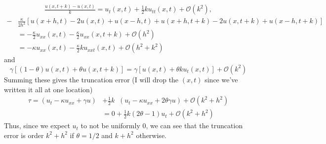 \documentclass[12pt]{article}
\def\O{\mathcal O}
\newcommand{\pdiff}[2][]{\mathop{\frac{\partial #1}{\partial #2}}}
\begin{document}
\begin{problems}
\begin{align*}
    \frac{u(x, t+k) - u(x, t)}{k} = 
    u_t(x,t) + \frac12 k u_{tt}(x,t) + \O(k^2),
\end{align*}
\begin{align*}
    -&\frac{\kappa}{2h^2}
    [u(x + h, t) - 2 u(x,t) + u(x-h, t) + u(x + h, t+k) - 2 u(x,t+k) + u(x-h, t+k)]\\
     &=-\frac\kappa2 u_{xx}(x,t) - \frac\kappa2 u_{xx}(x,t+k)+ \O(h^2)\\
     &=-\kappa u_{xx}(x,t) - \frac\kappa2 k u_{xxt}(x,t)+ \O(h^2 + k^2) 
\end{align*}
and 
$$\gamma[(1-\theta)u(x,t) + \theta u(x,t+k)] = 
\gamma[u(x,t) + \theta k u_t(x,t)] + \O(k^2)$$
Summing these gives the truncation error (I will drop the $(x,t)$ since we've written it 
all at one location)
\begin{align*}
\tau =    \left(u_t - \kappa u_{xx} + \gamma u\right)& 
+ \frac12 k \pdiff t\left(u_t - \kappa u_{xx} + 2\theta \gamma u\right) + \O(k^2 + h^2)\\
                                               & = 0 + \frac12 k (2\theta - 1) u_t + \O(k^2 + h^2)
\end{align*}
Thus, since we expect $u_t$ to not be uniformly 0, we can see that the truncation error 
is order $k^2 + h^2$ if $\theta = 1/2$ and $k + h^2$ otherwise.


\end{problems}
\end{document}
